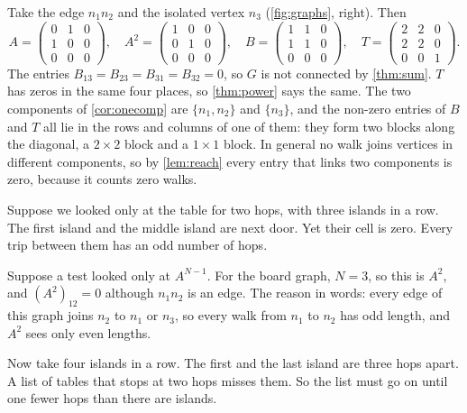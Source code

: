 \begin{example}\label{ex:disconnected}
Take the edge $n_1n_2$ and the isolated vertex $n_3$ (\cref{fig:graphs},
right). Then
\[
A=\begin{pmatrix}0&1&0\\1&0&0\\0&0&0\end{pmatrix},\quad
A^2=\begin{pmatrix}1&0&0\\0&1&0\\0&0&0\end{pmatrix},\quad
B=\begin{pmatrix}1&1&0\\1&1&0\\0&0&0\end{pmatrix},\quad
T=\begin{pmatrix}2&2&0\\2&2&0\\0&0&1\end{pmatrix}.
\]
The entries $B_{13}=B_{23}=B_{31}=B_{32}=0$, so $G$ is not connected by
\cref{thm:sum}. $T$ has zeros in the same four places, so \cref{thm:power}
says the same. The two components of \cref{cor:onecomp} are
$\{n_1,n_2\}$ and $\{n_3\}$, and the non-zero entries of $B$ and $T$ all lie
in the rows and columns of one of them: they form two blocks along the
diagonal, a $2\times 2$ block and a $1\times 1$ block. In general no walk
joins vertices in different components, so by \cref{lem:reach} every entry
that links two components is zero, because it counts zero walks.
\end{example}

\plainwords{} Suppose we looked only at the table for two hops, with three
islands in a row. The first island and the middle island are next door. Yet
their cell is zero. Every trip between them has an odd number of hops.

\begin{example}\label{ex:single}
Suppose a test looked only at $A^{N-1}$. For the board graph, $N=3$, so
this is $A^2$, and $(A^2)_{12}=0$ although $n_1n_2$ is an edge. The
reason in words: every edge of this graph joins $n_2$ to $n_1$ or $n_3$,
so every walk from $n_1$ to $n_2$ has odd length, and $A^2$ sees only even
lengths.
\end{example}

\plainwords{} Now take four islands in a row. The first and the last island
are three hops apart. A list of tables that stops at two hops misses them.
So the list must go on until one fewer hops than there are islands.

